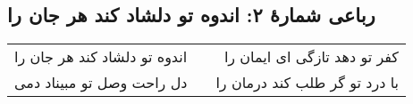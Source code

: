 \begin{center}
\section*{رباعی شمارهٔ ۲: اندوه تو دلشاد کند هر جان را }
\label{sec:002}
\begin{longtable}{l p{0.5cm} r}
اندوه تو دلشاد کند هر جان را 
&&
کفر تو دهد تازگی ای ایمان را 
\\
دل راحت وصل تو مبیناد دمی
&&
با درد تو گر طلب کند درمان را
\\
\end{longtable}
\end{center}
